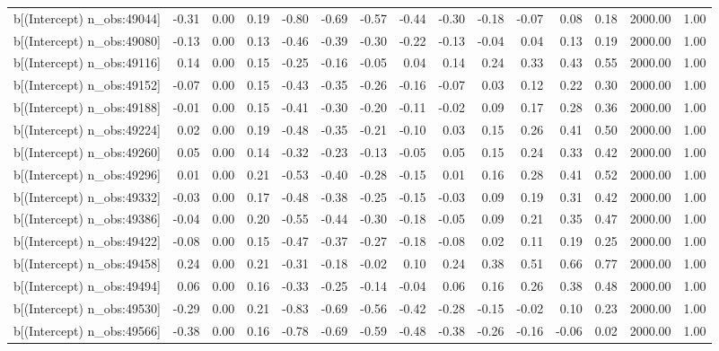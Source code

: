 \begin{table}[ht]
\begin{tabular}{rrrrrrrrrrrrrrr}
  b[(Intercept) n\_obs:49044] & -0.31 & 0.00 & 0.19 & -0.80 & -0.69 & -0.57 & -0.44 & -0.30 & -0.18 & -0.07 & 0.08 & 0.18 & 2000.00 & 1.00 \\ 
  b[(Intercept) n\_obs:49080] & -0.13 & 0.00 & 0.13 & -0.46 & -0.39 & -0.30 & -0.22 & -0.13 & -0.04 & 0.04 & 0.13 & 0.19 & 2000.00 & 1.00 \\ 
  b[(Intercept) n\_obs:49116] & 0.14 & 0.00 & 0.15 & -0.25 & -0.16 & -0.05 & 0.04 & 0.14 & 0.24 & 0.33 & 0.43 & 0.55 & 2000.00 & 1.00 \\ 
  b[(Intercept) n\_obs:49152] & -0.07 & 0.00 & 0.15 & -0.43 & -0.35 & -0.26 & -0.16 & -0.07 & 0.03 & 0.12 & 0.22 & 0.30 & 2000.00 & 1.00 \\ 
  b[(Intercept) n\_obs:49188] & -0.01 & 0.00 & 0.15 & -0.41 & -0.30 & -0.20 & -0.11 & -0.02 & 0.09 & 0.17 & 0.28 & 0.36 & 2000.00 & 1.00 \\ 
  b[(Intercept) n\_obs:49224] & 0.02 & 0.00 & 0.19 & -0.48 & -0.35 & -0.21 & -0.10 & 0.03 & 0.15 & 0.26 & 0.41 & 0.50 & 2000.00 & 1.00 \\ 
  b[(Intercept) n\_obs:49260] & 0.05 & 0.00 & 0.14 & -0.32 & -0.23 & -0.13 & -0.05 & 0.05 & 0.15 & 0.24 & 0.33 & 0.42 & 2000.00 & 1.00 \\ 
  b[(Intercept) n\_obs:49296] & 0.01 & 0.00 & 0.21 & -0.53 & -0.40 & -0.28 & -0.15 & 0.01 & 0.16 & 0.28 & 0.41 & 0.52 & 2000.00 & 1.00 \\ 
  b[(Intercept) n\_obs:49332] & -0.03 & 0.00 & 0.17 & -0.48 & -0.38 & -0.25 & -0.15 & -0.03 & 0.09 & 0.19 & 0.31 & 0.42 & 2000.00 & 1.00 \\ 
  b[(Intercept) n\_obs:49386] & -0.04 & 0.00 & 0.20 & -0.55 & -0.44 & -0.30 & -0.18 & -0.05 & 0.09 & 0.21 & 0.35 & 0.47 & 2000.00 & 1.00 \\ 
  b[(Intercept) n\_obs:49422] & -0.08 & 0.00 & 0.15 & -0.47 & -0.37 & -0.27 & -0.18 & -0.08 & 0.02 & 0.11 & 0.19 & 0.25 & 2000.00 & 1.00 \\ 
  b[(Intercept) n\_obs:49458] & 0.24 & 0.00 & 0.21 & -0.31 & -0.18 & -0.02 & 0.10 & 0.24 & 0.38 & 0.51 & 0.66 & 0.77 & 2000.00 & 1.00 \\ 
  b[(Intercept) n\_obs:49494] & 0.06 & 0.00 & 0.16 & -0.33 & -0.25 & -0.14 & -0.04 & 0.06 & 0.16 & 0.26 & 0.38 & 0.48 & 2000.00 & 1.00 \\ 
  b[(Intercept) n\_obs:49530] & -0.29 & 0.00 & 0.21 & -0.83 & -0.69 & -0.56 & -0.42 & -0.28 & -0.15 & -0.02 & 0.10 & 0.23 & 2000.00 & 1.00 \\ 
  b[(Intercept) n\_obs:49566] & -0.38 & 0.00 & 0.16 & -0.78 & -0.69 & -0.59 & -0.48 & -0.38 & -0.26 & -0.16 & -0.06 & 0.02 & 2000.00 & 1.00 \\ 

\end{tabular}
\end{table}

